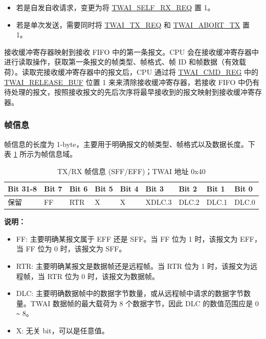 \documentclass[main\_\_CN.tex]{subfiles}
\begin{document}
\begin{itemize}
    \item 若是自发自收请求，变更为将 \hyperref[fielddesc:TWAISELFRXREQ]{TWAI\_SELF\_RX\_REQ} 置 1。
    \item 若是单次发送，需要同时将 \hyperref[fielddesc:TWAITXREQ]{TWAI\_TX\_REQ} 和 \hyperref[fielddesc:TWAIABORTTX]{TWAI\_ABORT\_TX} 置 1。
\end{itemize}

接收缓冲寄存器映射到接收 FIFO 中的第一条报文。CPU 会在接收缓冲寄存器中进行读取操作，获取第一条报文的帧类型、帧格式、帧 ID 和帧数据（有效载荷）。读取完接收缓冲寄存器中的报文后，CPU 通过将 \hyperref[regdesc:TWAICMDREG]{TWAI\_CMD\_REG} 中的 \hyperref[fielddesc:TWAIRELEASEBUF]{TWAI\_RELEASE\_BUF} 位置 1 来来清除接收缓冲寄存器，若接收 FIFO 中仍有待处理的报文，按照接收报文的先后次序将最早接收到的报文映射到接收缓冲寄存器。

\subsubsection{帧信息}
帧信息的长度为 1-byte，主要用于明确报文的帧类型、帧格式以及数据长度。下表 \ref{table:frame_info} 所示为帧信息域。

\begin{longtable}[c]{|p{1.4cm}|p{1.4cm}|p{1.4cm}|p{1.4cm}|p{1.4cm}|p{1.4cm}|p{1.4cm}|p{1.4cm}|p{1.4cm}|}
    \caption{TX/RX 帧信息 (SFF/EFF)；TWAI 地址 0x40}
    \label{table:frame_info}\\
    \hline
       \rowcolor{lightgray}
    Bit 31-8 & Bit 7 & Bit 6 & Bit 5 & Bit 4 & Bit 3 & Bit 2 & Bit 1 & Bit 0\\
    \hline
    保留 & FF & RTR  & X  & X  & XDLC.3 & DLC.2 & DLC.1 & DLC.0\\
    \hline
\end{longtable}
\vspace{-1.5em}
{\bfseries 说明：}\\
\begin{itemize}
    \item FF: 主要明确某报文属于 EFF 还是 SFF。当 FF 位为 1 时，该报文为 EFF，当 FF 位为 0 时，该报文为 SFF。
    \item RTR: 主要明确某报文是数据帧还是远程帧。当 RTR 位为 1 时，该报文为远程帧，当 RTR 位为 0 时，该报文为数据帧。
    \item DLC: 主要明确数据帧中的数据字节数量，或从远程帧中请求的数据字节数量。TWAI 数据帧的最大载荷为 8 个数据字节，因此 DLC 的数值范围应是 0 \verb+~+ 8。
    \item X: 无关 bit，可以是任意值。
\end{itemize}
\end{document}
